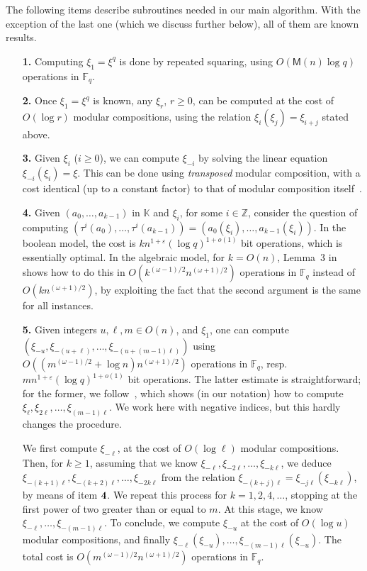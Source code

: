\documentclass[12pt]{article}
\theoremstyle{plain}
\theoremstyle{definition}
\def\Z{\ensuremath{\mathbb{Z}}}
\def\F{\ensuremath{\mathbb{F}}}
\def\K{\ensuremath{\mathbb{K}}}
\def\MM{\ensuremath{\mathsf{M}}}
\begin{document}
The following items describe subroutines needed in our main
algorithm. With the exception of the last one (which we discuss
further below), all of them are known results.
\begin{enumerate}
\item[{\bf 1.}] Computing $\xi_1=\xi^q$ is done by repeated squaring, using
  $O(\MM(n)\log q)$ operations in $\F_q$.
\item[{\bf 2.}] Once $\xi_1=\xi^q$ is known, any $\xi_r$, $r \ge 0$, can be
  computed at the cost of $O(\log r)$ modular compositions, using the
  relation $\xi_i(\xi_j) = \xi_{i+j}$ stated above.
\item[{\bf 3.}] Given $\xi_i$ ($i \ge 0$), we can compute $\xi_{-i}$ by solving
  the linear equation $\xi_{-i}(\xi_i) =\xi$. This can be done using
  {\em transposed} modular composition, with a cost identical (up to a
  constant factor) to that of modular composition 
  itself~\cite{Shoup94,DeDoSc2014}.
\item[{\bf 4.}] Given $(a_0,\dots,a_{k-1})$ in $\K$ and $\xi_i$, for
  some $i \in \Z$, consider the question of computing
  $(\tau^i(a_0),\dots,\tau^i(a_{k-1}))=(a_0(\xi_i),\dots,a_{k-1}(\xi_i))$. In
  the boolean model, the cost is $k n^{1+\varepsilon} (\log
  q)^{1+o(1)}$ bit operations, which is essentially optimal.
  In the algebraic model, for $k=O(n)$, Lemma~3 in~\cite{ks} shows how
  to do this in $O(k^{(\omega-1)/2}n^{(\omega+1)/2})$ operations in
  $\F_q$ instead of $O(kn^{(\omega+1)/2})$, by exploiting the fact that the second argument is the same
  for all instances.

\item[{\bf 5.}] Given integers $u,\ell,m \in O(n)$, and $\xi_1$, one
  can compute $(\xi_{-u},\xi_{-(u+\ell)},\dots,\xi_{-(u+(m-1)\ell)})$
  using $O((m^{(\omega-1)/2}+\log n) n^{(\omega+1)/2})$ operations in $\F_q$,
  resp.\, $m n^{1+\varepsilon} (\log q)^{1+o(1)}$ bit operations. The
  latter estimate is straightforward; for the former, we
  follow~\cite[Lemma~4]{ks}, which shows (in our notation) how to
  compute $\xi_\ell,\xi_{2\ell},\dots,\xi_{(m-1)\ell}$. We work here
  with negative indices, but this hardly changes the procedure.

  We first compute $\xi_{-\ell}$, at the cost of $O(\log \ell)$
  modular compositions. Then, for $k \ge 1$, assuming that we know
  $\xi_{-\ell},\xi_{-2\ell},\dots,\xi_{-k \ell}$, we deduce
  $\xi_{-(k+1)\ell},\xi_{-(k+2)\ell},\dots,\xi_{-2k \ell}$ from the
  relation $\xi_{-(k+j)\ell}=\xi_{-j\ell}(\xi_{-k\ell})$, by means of
  item ${\bf 4}$. We repeat this process for $k=1,2,4,\dots$, stopping
  at the first power of two greater than or equal to $m$.  At this
  stage, we know $\xi_{-\ell},\dots,\xi_{-(m-1)\ell}$. To conclude, we
  compute $\xi_{-u}$ at the cost of $O(\log u)$ modular compositions, and finally
  $\xi_{-\ell}(\xi_{-u}),\dots,\xi_{-(m-1)\ell}(\xi_{-u})$. The total
  cost is $O(m^{(\omega-1)/2}n^{(\omega+1)/2})$ operations in $\F_q$.


\end{enumerate}
\end{document}
